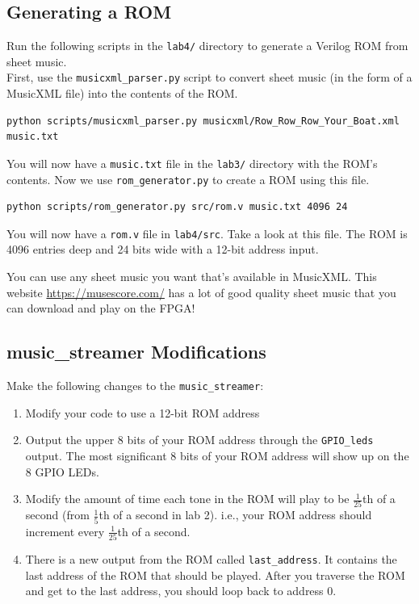 \documentclass[11pt]{article}
\begin{document}
\subsection{Generating a ROM}
Run the following scripts in the \verb|lab4/| directory to generate a Verilog ROM from sheet music.\\

First, use the \verb|musicxml_parser.py| script to convert sheet music (in the form of a MusicXML file) into the contents of the ROM.

\begin{verbatim}
python scripts/musicxml_parser.py musicxml/Row_Row_Row_Your_Boat.xml music.txt
\end{verbatim}

You will now have a \verb|music.txt| file in the \verb|lab3/| directory with the ROM's contents. Now we use \verb|rom_generator.py| to create a ROM using this file.

\begin{verbatim}
python scripts/rom_generator.py src/rom.v music.txt 4096 24
\end{verbatim}

You will now have a \verb|rom.v| file in \verb|lab4/src|. Take a look at this file. The ROM is 4096 entries deep and 24 bits wide with a 12-bit address input. 

You can use any sheet music you want that's available in MusicXML. This website \url{https://musescore.com/} has a lot of good quality sheet music that you can download and play on the FPGA!

\subsection{music\_streamer Modifications}

Make the following changes to the \verb|music_streamer|:

\begin{enumerate}
	\item Modify your code to use a 12-bit ROM address
	
	\item Output the upper 8 bits of your ROM address through the \verb|GPIO_leds| output. The most significant 8 bits of your ROM address will show up on the 8 GPIO LEDs.
	
	\item Modify the amount of time each tone in the ROM will play to be $\frac{1}{25}$th of a second (from $\frac{1}{5}$th of a second in lab 2). i.e., your ROM address should increment every $\frac{1}{25}$th of a second.
	
	\item There is a new output from the ROM called \verb|last_address|. It contains the last address of the ROM that should be played. After you traverse the ROM and get to the last address, you should loop back to address 0.
\end{enumerate}
\end{document}
